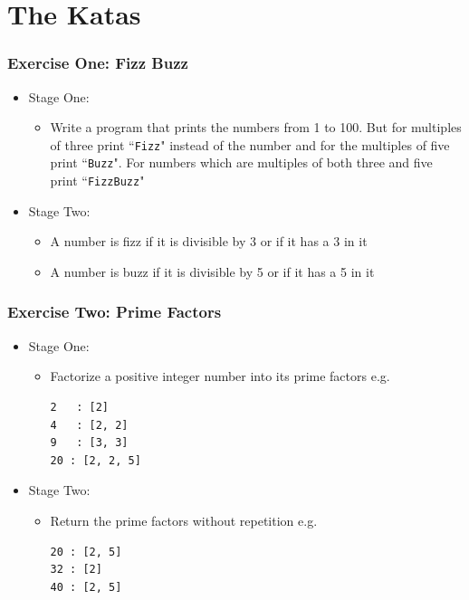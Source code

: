 \documentclass[10pt,t,sans,mathsans,xcolor=dvipsnames]{beamer}
\begin{document}
\section{The Katas}
\begin{frame}[fragile]
\frametitle{Exercise One: Fizz Buzz}
\begin{itemize}
\item Stage One:
\begin{itemize}
\item Write a program that prints the numbers from 1 to 100. But for multiples of three print ``\texttt{Fizz}" instead of the number and for the multiples of five print ``\texttt{Buzz}". For numbers which are multiples of both three and five print ``\texttt{FizzBuzz}"
\end{itemize}
\item Stage Two:
\begin{itemize}
\item A number is fizz if it is divisible by 3 or if it has a 3 in it
\item A number is buzz if it is divisible by 5 or if it has a 5 in it
\end{itemize}
\end{itemize}
\end{frame}
\begin{frame}[fragile]
\frametitle{Exercise Two: Prime Factors}
\begin{itemize}
\item Stage One:
\begin{itemize}
\item Factorize a positive integer number into its prime factors e.g.
\begin{verbatim}
2 	: [2]
4 	: [2, 2]
9 	: [3, 3]
20 : [2, 2, 5]
\end{verbatim}
\end{itemize}
\item Stage Two:
\begin{itemize}
\item Return the prime factors without repetition e.g.
\begin{verbatim}
20 : [2, 5]
32 : [2]
40 : [2, 5]
\end{verbatim}
\end{itemize}
\end{itemize}
\end{frame}
\end{document}

